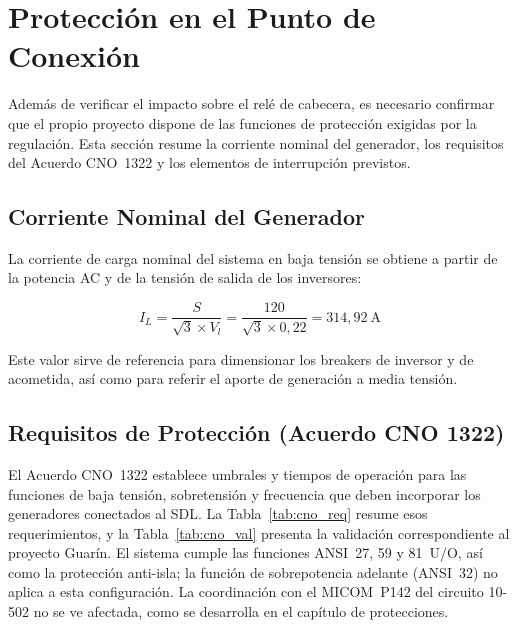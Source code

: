 \begin{table}[H]
    \centering
    \caption{Cortocircuito trifásico a las 12:00 (ruta al POC y cabecera)}
    \label{tab:cc_3f}
    
\end{table}

\begin{table}[H]
    \centering
    \caption{Aporte de cortocircuito de los inversores (1,5 $I_L$, referido a MT)}
    \label{tab:cc_aporte}
    
\end{table}





\section{Protección en el Punto de Conexión}

Además de verificar el impacto sobre el relé de cabecera, es necesario confirmar que el propio proyecto dispone de las funciones de protección exigidas por la regulación. Esta sección resume la corriente nominal del generador, los requisitos del Acuerdo CNO~1322 y los elementos de interrupción previstos.

\subsection{Corriente Nominal del Generador}

La corriente de carga nominal del sistema en baja tensión se obtiene a partir de la potencia AC y de la tensión de salida de los inversores:

\begin{equation}
I_L = \frac{S}{\sqrt{3}\times V_l} = \frac{120}{\sqrt{3}\times 0{,}22} = 314{,}92~\text{A}
\end{equation}

Este valor sirve de referencia para dimensionar los breakers de inversor y de acometida, así como para referir el aporte de generación a media tensión.

\subsection{Requisitos de Protección (Acuerdo CNO 1322)}

El Acuerdo CNO~1322 establece umbrales y tiempos de operación para las funciones de baja tensión, sobretensión y frecuencia que deben incorporar los generadores conectados al SDL. La Tabla~\ref{tab:cno_req} resume esos requerimientos, y la Tabla~\ref{tab:cno_val} presenta la validación correspondiente al proyecto Guarín. El sistema cumple las funciones ANSI~27, 59 y 81~U/O, así como la protección anti-isla; la función de sobrepotencia adelante (ANSI~32) no aplica a esta configuración. La coordinación con el MICOM~P142 del circuito 10-502 no se ve afectada, como se desarrolla en el capítulo de protecciones.

